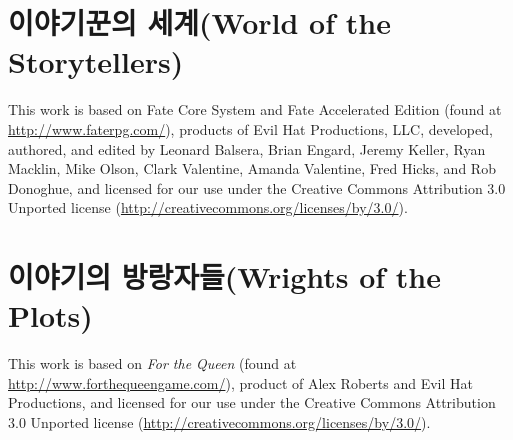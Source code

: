 \documentclass{report}
\begin{document}
	\section*{이야기꾼의 세계(World of the Storytellers)}
	
	This work is based on Fate Core System and Fate Accelerated Edition (found at \url{http://www.faterpg.com/}), products of Evil Hat Productions, LLC, developed, authored, and edited by Leonard Balsera, Brian Engard, Jeremy Keller, Ryan Macklin, Mike Olson, Clark Valentine, Amanda Valentine, Fred Hicks, and Rob Donoghue, and licensed for our use under the Creative Commons Attribution 3.0 Unported license (\url{http://creativecommons.org/licenses/by/3.0/}).
	
	\section*{이야기의 방랑자들(Wrights of the Plots)}
	
	This work is based on \textit{For the Queen} (found at \url{http://www.forthequeengame.com/}), product of Alex Roberts and Evil Hat Productions, and licensed for our use under the Creative Commons Attribution 3.0 Unported license (\url{http://creativecommons.org/licenses/by/3.0/}). 
	
\end{document}
